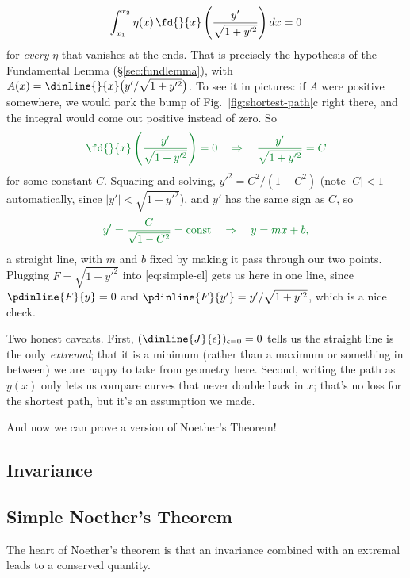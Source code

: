 \documentclass[12pt]{article}
\numberwithin{equation}{section}
\begin{document}
\begin{equation}
  \int_{x_1}^{x_2}\eta(x)\,\fd{}{x}\left(\frac{y'}{\sqrt{1+y'^2}}\right)dx = 0
\end{equation}
for \emph{every} $\eta$ that vanishes at the ends. That is precisely
the hypothesis of the \textcolor{lemmagreen}{Fundamental Lemma}
(\S\ref{sec:fundlemma}), with
$A(x) = \dinline{}{x}\bigl(y'/\sqrt{1+y'^2}\bigr)$. To see it in
pictures: if $A$ were positive somewhere, we would park the
\textcolor{lemmagreen}{bump} of Fig.~\ref{fig:shortest-path}c right
there, and the integral would come out positive instead of zero. So
\begin{equation}
  \textcolor{lemmagreen}{\fd{}{x}\left(\frac{y'}{\sqrt{1+y'^2}}\right) = 0
  \quad\Rightarrow\quad \frac{y'}{\sqrt{1+y'^2}} = C}
\end{equation}
for some constant $C$. Squaring and solving, $y'^2 = C^2/(1-C^2)$
(note $|C|<1$ automatically, since $|y'| < \sqrt{1+y'^2}$), and $y'$
has the same sign as $C$, so
\begin{equation}
  \textcolor{lemmagreen}{y' = \frac{C}{\sqrt{1-C^2}} = \textrm{const}
  \quad\Rightarrow\quad y = mx + b,}
\end{equation}
\textcolor{lemmagreen}{a straight line}, with $m$ and $b$ fixed by
making it pass through our two points. Plugging $F=\sqrt{1+y'^2}$
into \eqref{eq:simple-el} gets us here in one line, since
$\pdinline{F}{y}=0$ and $\pdinline{F}{y'} = y'/\sqrt{1+y'^2}$, which
is a nice check.

Two honest caveats. First, $(\dinline{J}{\epsilon})_{\epsilon=0}=0$
tells us the straight line is the only \emph{extremal}; that it is a
minimum (rather than a maximum or something in between) we are happy
to take from geometry here. Second, writing the path as $y(x)$ only
lets us compare curves that never double back in $x$; that's no loss
for the shortest path, but it's an assumption we made.

And now we can prove a version of Noether's Theorem!

\subsection{Invariance}

\subsection{Simple Noether's Theorem}
\label{sec:simplenoether}

The heart of Noether's theorem is that an invariance combined with an
extremal leads to a conserved quantity.
\end{document}
